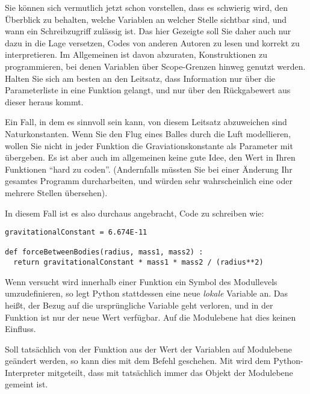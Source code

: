 \begin{warnbox}
Sie können sich vermutlich jetzt schon vorstellen, dass es schwierig wird, den Überblick zu behalten, welche Variablen an welcher Stelle sichtbar sind, und wann ein Schreibzugriff zulässig ist. Das hier Gezeigte soll Sie daher auch nur dazu in die Lage versetzen, Codes von anderen Autoren zu lesen und korrekt zu interpretieren. Im Allgemeinen ist davon abzuraten, Konstruktionen zu programmieren, bei denen Variablen über Scope-Grenzen hinweg genutzt werden. Halten Sie sich am besten an den Leitsatz, dass Information nur über die Parameterliste in eine Funktion gelangt, und nur über den Rückgabewert aus dieser heraus kommt.
\end{warnbox}
\begin{hintbox}[Konstanten]
Ein Fall, in dem es sinnvoll sein kann, von diesem Leitsatz abzuweichen sind Naturkonstanten. Wenn Sie den Flug eines Balles durch die Luft modellieren, wollen Sie nicht in jeder Funktion die Graviationskonstante als Parameter mit übergeben. Es ist aber auch im allgemeinen keine gute Idee, den Wert in Ihren Funktionen \enquote{hard zu coden}. (Andernfalls müssten Sie bei einer Änderung Ihr gesamtes Programm durcharbeiten, und würden sehr wahrscheinlich eine oder mehrere Stellen übersehen).

In diesem Fall ist es also durchaus angebracht, Code zu schreiben wie:
\begin{codebox}
\begin{verbatim}
gravitationalConstant = 6.674E-11

def forceBetweenBodies(radius, mass1, mass2) :
  return gravitationalConstant * mass1 * mass2 / (radius**2)
\end{verbatim}
\end{codebox}
\end{hintbox}

Wenn versucht wird innerhalb einer Funktion ein Symbol des Modullevels umzudefinieren, so legt Python stattdessen eine neue \emph{lokale} Variable an. Das heißt, der Bezug auf die ursprüngliche Variable geht verloren, und in der Funktion ist nur der neue Wert verfügbar. Auf die Modulebene hat dies keinen Einfluss.

Soll tatsächlich von der Funktion aus der Wert der Variablen auf Modulebene geändert werden, so kann dies mit dem Befehl  geschehen. Mit  wird dem Python-Interpreter mitgeteilt, dass mit  tatsächlich immer das Objekt der Modulebene gemeint ist.

